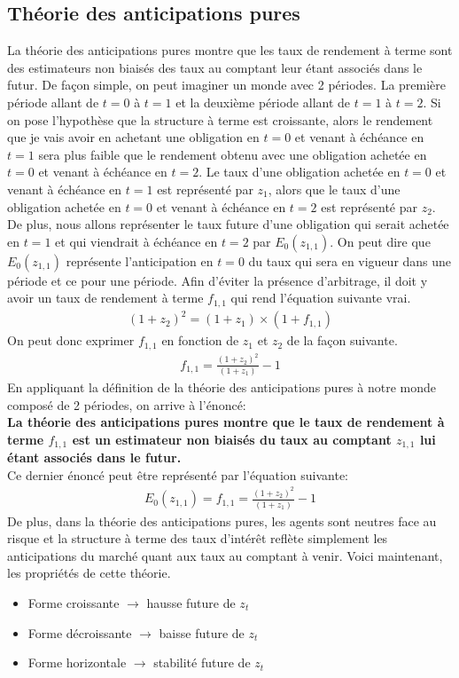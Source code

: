 \documentclass[12pt]{article}
\begin{document}
\subsection{Théorie des anticipations pures}
La théorie des anticipations pures montre que les taux de rendement à terme sont des estimateurs non biaisés des taux au comptant leur étant associés dans le futur.  De façon simple, on peut imaginer un monde avec 2 périodes. La première période allant de $t=0$ à $t=1$ et la deuxième période allant de $t=1$ à $t=2$.  Si on pose l'hypothèse que la structure à terme est croissante,  alors le rendement que je vais avoir en achetant une obligation en $t=0$ et venant à échéance en $t=1$ sera plus faible que le rendement obtenu avec une obligation achetée en $t=0$ et venant à échéance en $t=2$.  Le taux d'une obligation achetée en $t=0$ et venant à échéance en $t=1$ est représenté par $z_{1}$,  alors que le taux d'une obligation achetée en $t=0$ et venant à échéance en $t=2$ est représenté par $z_{2}$.  De plus, nous allons représenter le taux future d'une obligation qui serait achetée en $t=1$ et qui viendrait à échéance en $t=2$ par $E_0(z_{1,1})$.  On peut dire que $E_0(z_{1,1})$ représente l'anticipation en $t=0$ du taux qui sera en vigueur dans une période et ce pour une période.  Afin d'éviter la présence d'arbitrage, il doit y avoir un taux de rendement à terme $f_{1,1}$ qui rend l'équation suivante vrai.
\begin{align*}
(1+z_2)^2=(1+z_1) \times (1+f_{1,1})
\end{align*}
On peut donc exprimer $f_{1,1}$ en fonction de $z_1$ et $z_2$ de la façon suivante.
\begin{align*}
f_{1,1}=\frac{(1+z_2)^2}{(1+z_1)}-1
\end{align*}
En appliquant la définition de la théorie des anticipations pures à notre monde composé de 2 périodes, on arrive à l'énoncé: \\
 \textbf{La théorie des anticipations pures montre que le taux de rendement à terme $f_{1,1}$ est un estimateur non biaisés du taux au comptant $z_{1,1}$ lui étant associés dans le futur. }\\
Ce dernier énoncé peut être représenté par l'équation suivante:
\begin{align*}
E_0(z_{1,1})=f_{1,1}=\frac{(1+z_2)^2}{(1+z_1)}-1
\end{align*}
\newpage
De plus,  dans la théorie des anticipations pures, les agents sont neutres face au risque et la structure à terme des taux d’intérêt reflète simplement les anticipations du marché quant aux taux au comptant à venir.  Voici maintenant,  les propriétés de cette théorie.
\begin{itemize}
\item  Forme croissante $\rightarrow$ hausse future de $z_t$
\item Forme décroissante $\rightarrow$ baisse future de $z_t$
\item Forme horizontale $\rightarrow$ stabilité future de $z_t$
\end{itemize}
\end{document}
